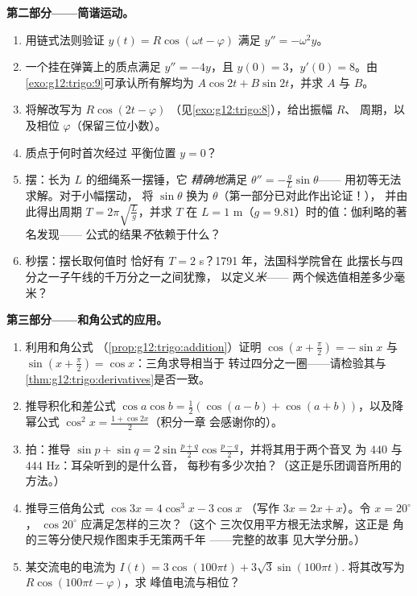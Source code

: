 \begin{problem}
\medskip
\noindent\textbf{第二部分——简谐运动。}
\begin{enumerate}[resume]
  \item 用链式法则验证
        $y(t) = R\cos(\omega t - \varphi)$ 满足
        $y'' = -\omega^2 y$。
  \item 一个挂在弹簧上的质点满足 $y'' = -4y$，且
        $y(0) = 3$，$y'(0) = 8$。由
        \cref{exo:g12:trigo:9}可承认所有解均为
        $A\cos 2t + B\sin 2t$，并求 $A$ 与 $B$。
  \item 将解改写为 $R\cos(2t - \varphi)$
        （见\cref{exo:g12:trigo:8}），给出振幅 $R$、
        周期，以及相位 $\varphi$（保留三位小数）。
  \item 质点于何时首次经过
        平衡位置 $y = 0$？
  \item 摆：长为 $L$ 的细绳系一摆锤，它
        \emph{精确地}满足 $\theta'' = -\frac gL \sin\theta$——
        用初等无法求解。对于小幅摆动，
        将 $\sin\theta$ 换为 $\theta$（第一部分已对此作出论证！），
        并由此得出周期
        $T = 2\pi\sqrt{\frac Lg}$，并求 $T$ 在
        $L = 1$ m（$g = 9.81$）时的值：伽利略的著名发现——
        公式的结果\emph{不}依赖于什么？
  \item 秒摆：摆长取何值时
        恰好有 $T = 2$ s？1791 年，法国科学院曾在
        此摆长与四分之一子午线的千万分之一之间犹豫，
        以定义\emph{米}——
        两个候选值相差多少毫米？
\end{enumerate}

\medskip
\noindent\textbf{第三部分——和角公式的应用。}
\begin{enumerate}[resume]
  \item 利用和角公式
        （\cref{prop:g12:trigo:addition}）证明
        $\cos\left(x + \frac\pi2\right) = -\sin x$ 与
        $\sin\left(x + \frac\pi2\right) = \cos x$：三角求导相当于
        转过四分之一圈——请检验其与
        \cref{thm:g12:trigo:derivatives}是否一致。
  \item 推导积化和差公式
        $\cos a \cos b = \frac12\left(\cos(a - b) +
        \cos(a + b)\right)$，以及降幂公式
        $\cos^2 x = \frac{1 + \cos 2x}{2}$（积分一章
        会感谢你的）。
  \item 拍：推导
        $\sin p + \sin q = 2 \sin\frac{p + q}{2}
        \cos\frac{p - q}{2}$，并将其用于两个音叉
        为 $440$ 与 $444$ Hz：耳朵听到的是什么音，
        每秒有多少次拍？（这正是乐团调音所用的
        方法。）
  \item 推导三倍角公式
        $\cos 3x = 4\cos^3 x - 3\cos x$
        （写作 $3x = 2x + x$）。令 $x = 20^\circ$，
        $\cos 20^\circ$ 应满足怎样的三次？（这个
        三次仅用平方根无法求解，这正是
        角的三等分使尺规作图束手无策两千年
        ——完整的故事
        见大学分册。）
  \item 某交流电的电流为
        $I(t) = 3\cos(100\pi t) + 3\sqrt3 \sin(100\pi t)$.
        将其改写为 $R\cos(100\pi t - \varphi)$，求
        峰值电流与相位？
\end{enumerate}


\end{problem}
